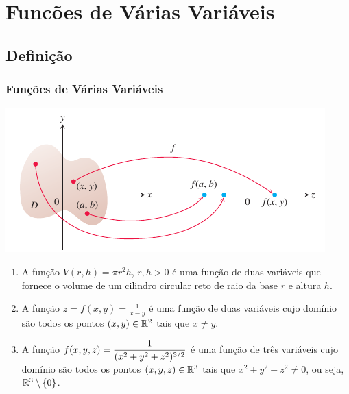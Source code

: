 \section{Funcões de Várias Variáveis}



\subsection*{Definição}
\begin{frame}[label=funcoes]
\frametitle{Funções de Várias Variáveis }


\begin{center}
\includegraphics[scale=.7]{figuras/func.png}
\end{center}

\end{frame}

\begin{frame}[label=funcoes]

\begin{exe} \begin{enumerate}
\item A função $V(r,h)=\pi r^2h$, $r,h>0$ é uma função de duas variáveis que  fornece o volume de um cilindro circular reto de raio da base $r$ e altura $h$.

 \item A função $z=f(x,y)=\frac{1}{x-y}$ é uma função de duas variáveis cujo domínio são todos os pontos $(x,y)\in \mathbb{R}^2$ tais que $x\neq y$.
 
 \item A função $\displaystyle f(x,y,z)=\frac{1}{(x^2+y^2+z^2)^{3/2}}$ é uma função de três variáveis cujo domínio são todos os pontos $(x,y,z)\in \mathbb{R}^3$ tais que $x^2+y^2+z^2\neq 0$, ou seja, $\mathbb{R}^3\setminus\{0\}$.
 \end{enumerate}
 \end{exe}
 
\end{frame}


